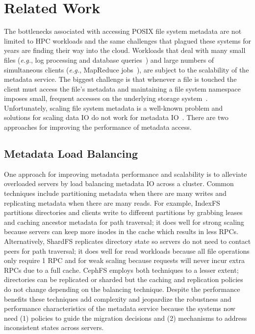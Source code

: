 \section{Related Work} 
\label{sec:related-work}

The bottlenecks associated with accessing POSIX file system metadata are not limited
to HPC workloads and the same challenges that plagued these systems for years are
finding their way into the cloud. Workloads that deal with many small files
({\it e.g.}, log processing and database
queries~\cite{thusoo:sigmod2010-facebook-infrastructure}) and large numbers of
simultaneous clients ({\it e.g.}, MapReduce
jobs~\cite{mckusick:acm2010-gfs-evolution}), are subject to the scalability of
the metadata service. The biggest challenge is that whenever a file
is touched the client must access the file's metadata and maintaining a file
system namespace imposes small, frequent accesses on the underlying storage
system~\cite{roselli:atec2000-FS-workloads}.  Unfortunately, scaling file
system metadata is a well-known problem and solutions for scaling data IO do
not work for metadata IO~\cite{roselli:atec2000-FS-workloads,
abad:techreport2012-fstrace, abad:ucc2012-mimesis,
alam:pdsw2011-metadata-scaling, weil:osdi2006-ceph}. There are two approaches
for improving the performance of metadata access.

\subsection{Metadata Load Balancing}

One approach for improving metadata performance and scalability is to alleviate
overloaded servers by load balancing metadata IO across a cluster. Common
techniques include partitioning metadata when there are many writes and
replicating metadata when there are many reads. For example, IndexFS~\cite{ren:sc2014-indexfs} partitions
directories and clients write to different partitions by grabbing leases and
caching ancestor metadata for path traversal; it does well for strong scaling
because servers can keep more inodes in the cache which results in less RPCs.
Alternatively, ShardFS replicates directory state so servers do not need to
contact peers for path traversal; it does well for read workloads because all
file operations only require 1 RPC and for weak scaling because requests will
never incur extra RPCs due to a full cache.  CephFS employs both techniques to
a lesser extent; directories can be replicated or sharded but the caching and
replication policies do not change depending on the balancing technique.
Despite the performance benefits these techniques add complexity and jeopardize
the robustness and performance characteristics of the metadata service because
the systems now need (1) policies to guide the migration decisions and (2)
mechanisms to address inconsistent states across servers.

